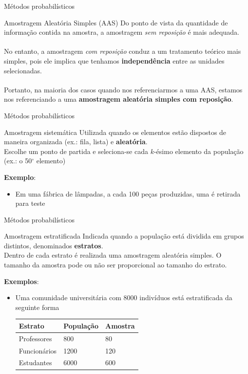 \documentclass[10pt]{beamer}
\theoremstyle{definition}
\begin{document}
\begin{frame}{Métodos probabilísticos}
  \begin{block}{Amostragem Aleatória Simples (AAS)}
    Do ponto de vista da quantidade de informação contida na amostra,
    a amostragem \textsl{sem reposição} é mais adequada. \\~\\
    No entanto, a amostragem \textsl{com reposição} conduz a um
    tratamento teórico mais simples, pois ele implica que tenhamos
    \textbf{independência} entre as unidades selecionadas. \\~\\
    Portanto, na maioria dos casos quando nos referenciarmos a uma AAS,
    estamos nos referenciando a uma \textbf{amostragem aleatória simples
    com reposição}.
  \end{block}
\end{frame}

\begin{frame}{Métodos probabilísticos}
  \begin{block}{Amostragem sistemática}
    Utilizada quando os elementos estão dispostos de maneira organizada
    (ex.: fila, lista) e \textbf{aleatória}.\\
    Escolhe um ponto de partida e seleciona-se cada $k$-ésimo elemento
    da população (ex.: o 50$^{\circ}$ elemento)
  \end{block}
  \textbf{Exemplo}:
  \begin{itemize}
  \item Em uma fábrica de lâmpadas, a cada 100 peças produzidas, uma é
    retirada para teste
  \end{itemize}
\end{frame}

\begin{frame}{Métodos probabilísticos}
  \begin{block}{Amostragem estratificada}
    Indicada quando a população está dividida em grupos distintos,
    denominados \textbf{estratos}.\\
    Dentro de cada estrato é realizada uma amostragem aleatória
    simples. O tamanho da amostra pode ou não ser proporcional ao
    tamanho do estrato.
  \end{block}
  \textbf{Exemplos}:
  \begin{itemize}
  \item Uma comunidade universitária com 8000 indivíduos está
    estratificada da seguinte forma
    \begin{table}[h]
      \centering
      \begin{tabular}{lll}
        \hline
        \textbf{Estrato} & \textbf{População} & \textbf{Amostra} \\ \hline
        Professores & 800 & 80 \\ \hline
        Funcionários & 1200 & 120 \\ \hline
        Estudantes & 6000 & 600 \\
        \hline
      \end{tabular}
    \end{table}
  \end{itemize}
\end{frame}
\end{document}
